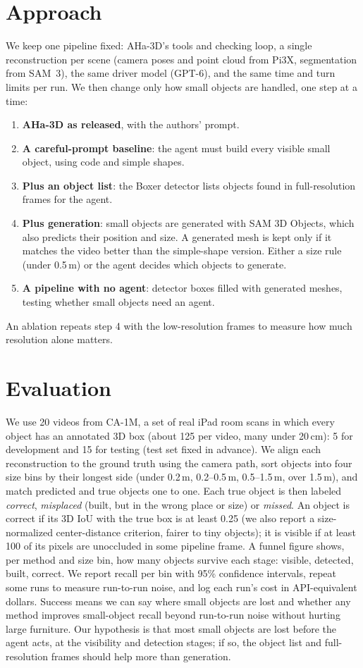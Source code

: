 \documentclass[11pt]{article}
\begin{document}
\section*{Approach}
We keep one pipeline fixed: AHa-3D's tools and checking loop, a single reconstruction per scene (camera poses and point cloud from Pi3X, segmentation from SAM~3), the same driver model (GPT-6), and the same time and turn limits per run. We then change only how small objects are handled, one step at a time:
\begin{enumerate}
\item \textbf{AHa-3D as released}, with the authors' prompt.
\item \textbf{A careful-prompt baseline}: the agent must build every visible small object, using code and simple shapes.
\item \textbf{Plus an object list}: the Boxer detector lists objects found in full-resolution frames for the agent.
\item \textbf{Plus generation}: small objects are generated with SAM 3D Objects, which also predicts their position and size. A generated mesh is kept only if it matches the video better than the simple-shape version. Either a size rule (under 0.5\,m) or the agent decides which objects to generate.
\item \textbf{A pipeline with no agent}: detector boxes filled with generated meshes, testing whether small objects need an agent.
\end{enumerate}
An ablation repeats step 4 with the low-resolution frames to measure how much resolution alone matters.

\section*{Evaluation}
We use 20 videos from CA-1M, a set of real iPad room scans in which every object has an annotated 3D box (about 125 per video, many under 20\,cm): 5 for development and 15 for testing (test set fixed in advance). We align each reconstruction to the ground truth using the camera path, sort objects into four size bins by their longest side (under 0.2\,m, 0.2--0.5\,m, 0.5--1.5\,m, over 1.5\,m), and match predicted and true objects one to one. Each true object is then labeled \emph{correct}, \emph{misplaced} (built, but in the wrong place or size) or \emph{missed}. An object is correct if its 3D IoU with the true box is at least 0.25 (we also report a size-normalized center-distance criterion, fairer to tiny objects); it is visible if at least 100 of its pixels are unoccluded in some pipeline frame. A funnel figure shows, per method and size bin, how many objects survive each stage: visible, detected, built, correct. We report recall per bin with 95\% confidence intervals, repeat some runs to measure run-to-run noise, and log each run's cost in API-equivalent dollars. Success means we can say where small objects are lost and whether any method improves small-object recall beyond run-to-run noise without hurting large furniture. Our hypothesis is that most small objects are lost before the agent acts, at the visibility and detection stages; if so, the object list and full-resolution frames should help more than generation.
\end{document}
